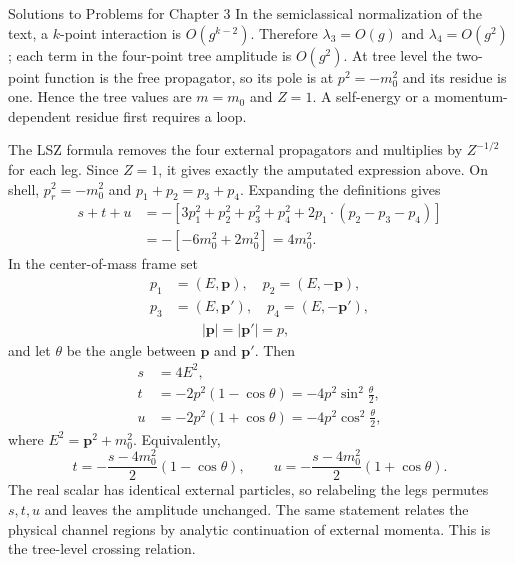\begin{bankssolutions}{Solutions to Problems for Chapter 3}
In the semiclassical normalization of the text, a $k$-point interaction is
$O(g^{k-2})$.  Therefore $\lambda_3=O(g)$ and $\lambda_4=O(g^2)$; each term
in the four-point tree amplitude is $O(g^2)$.  At tree level the two-point
function is the free propagator, so its pole is at $p^2=-m_0^2$ and its residue
is one.  Hence the tree values are $m=m_0$ and $Z=1$.  A self-energy or a
momentum-dependent residue first requires a loop.

The LSZ formula removes the four external propagators and multiplies by
$Z^{-1/2}$ for each leg.  Since $Z=1$, it gives exactly the amputated
expression above.  On shell, $p_r^2=-m_0^2$ and
$p_1+p_2=p_3+p_4$.  Expanding the definitions gives
\begin{align*}
 s+t+u
 &=-\left[3p_1^2+p_2^2+p_3^2+p_4^2
 +2p_1\!\cdot(p_2-p_3-p_4)\right]\\
 &=-\left[-6m_0^2+2m_0^2\right]=4m_0^2.
\end{align*}
In the center-of-mass frame set
\begin{equation*}
 \begin{aligned}
 p_1&=(E,\mathbf p),\quad p_2=(E,-\mathbf p),\\[-2pt]
 p_3&=(E,\mathbf p'),\quad p_4=(E,-\mathbf p'),\\[-2pt]
 &\qquad |\mathbf p|=|\mathbf p'|=p,
 \end{aligned}
\end{equation*}
and let $\theta$ be the angle between $\mathbf p$ and $\mathbf p'$.  Then
\begin{equation*}
 \begin{aligned}
 s&=4E^2,\\[-2pt]
 t&=-2p^2(1-\cos\theta)=-4p^2\sin^2\frac\theta2,\\[-2pt]
 u&=-2p^2(1+\cos\theta)=-4p^2\cos^2\frac\theta2,
 \end{aligned}
\end{equation*}
where $E^2=\mathbf p^2+m_0^2$.  Equivalently,
\begin{equation*}
 t=-\frac{s-4m_0^2}{2}(1-\cos\theta),
 \qquad u=-\frac{s-4m_0^2}{2}(1+\cos\theta).
\end{equation*}
The real scalar has identical external particles, so relabeling the legs
permutes $s,t,u$ and leaves the amplitude unchanged.  The same statement
relates the physical channel regions by analytic continuation of external
momenta.  This is the tree-level crossing relation.


\end{bankssolutions}
